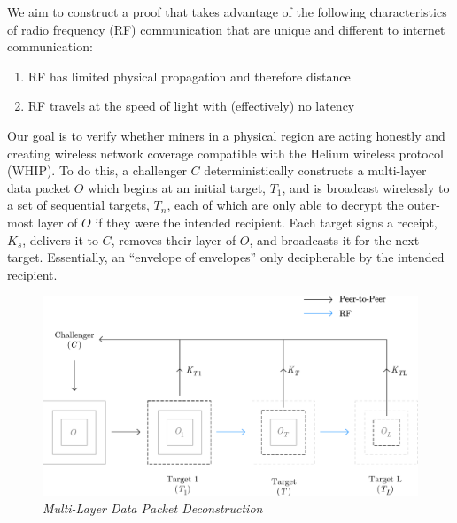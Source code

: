 \documentclass[UTF8, 10pt, nonatbib, nocopyrightspace, reprint]{sigplanconf}
\begin{document}
We aim to construct a proof that takes advantage of the following characteristics of radio frequency (RF) communication that are unique and different to internet communication:

\begin{enumerate}
    \item RF has limited physical propagation and therefore distance
    \item RF travels at the speed of light with (effectively) no latency
\end{enumerate}

Our goal is to verify whether miners in a physical region are acting honestly and creating wireless network coverage compatible with the Helium wireless protocol (WHIP). To do this, a challenger $C$ deterministically constructs a multi-layer data packet $O$ which begins at an initial target, $T_1$, and is broadcast wirelessly to a set of sequential targets, $T_n$, each of which are only able to decrypt the outer-most layer of $O$ if they were the intended recipient. Each target signs a receipt, $K_s$, delivers it to $C$, removes their layer of $O$, and broadcasts it for the next target. Essentially, an ``envelope of envelopes'' only decipherable by the intended recipient.

\begin{figure}[ht]
    \begin{center}
          \includegraphics[width=\columnwidth]{deconstruction.eps}
          \caption{\emph{Multi-Layer Data Packet Deconstruction}}
          \label{fig:poc-deconstruction}
     \end{center}
\end{figure}
\end{document}
